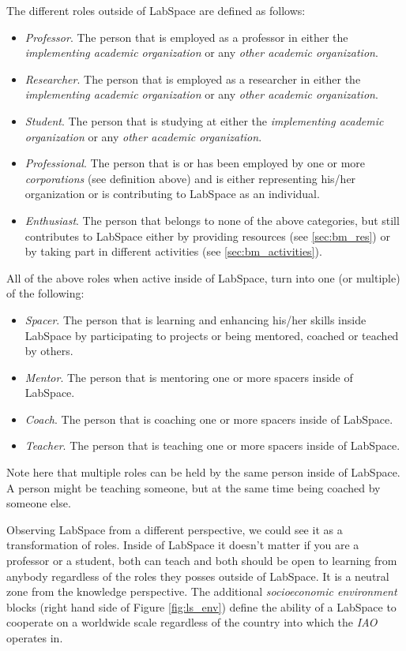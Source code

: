 \documentclass[a4paper, 11pt]{article}
\begin{document}
The different roles outside of LabSpace are defined as follows:

\begin{itemize}[noitemsep]
    \item \textit{Professor}. The person that is employed as a professor in either the \textit{implementing academic organization} or any \textit{other academic organization}.
    \item \textit{Researcher}. The person that is employed as a researcher in either the \textit{implementing academic organization} or any \textit{other academic organization}.
    \item \textit{Student}. The person that is studying at either the \textit{implementing academic organization} or any \textit{other academic organization}.
    \item \textit{Professional}. The person that is or has been employed by one or more \textit{corporations} (see definition above) and is either representing his/her organization or is contributing to LabSpace as an individual.
    \item \textit{Enthusiast}. The person that belongs to none of the above categories, but still contributes to LabSpace either by providing resources (see \ref{sec:bm_res}) or by taking part in different activities  (see \ref{sec:bm_activities}).
\end{itemize}

All of the above roles when active inside of LabSpace, turn into one (or multiple) of the following:

\begin{itemize}[noitemsep]
    \item \textit{Spacer}. The person that is learning and enhancing his/her skills inside LabSpace by participating to projects or being mentored, coached or teached by others.
    \item \textit{Mentor}. The person that is mentoring one or more spacers inside of LabSpace.
    \item \textit{Coach}. The person that is coaching one or more spacers inside of LabSpace.
    \item \textit{Teacher}. The person that is teaching one or more spacers inside of LabSpace.
\end{itemize}

Note here that multiple roles can be held by the same person inside of LabSpace. A person might be teaching someone, but at the same time being coached by someone else.

Observing LabSpace from a different perspective, we could see it as a transformation of roles. Inside of LabSpace it doesn't matter if you are a professor or a student, both can teach and both should be open to learning from anybody regardless of the roles they posses outside of LabSpace. It is a neutral zone from the knowledge perspective. The additional \textit{socioeconomic environment} blocks (right hand side of Figure \ref{fig:ls_env}) define the ability of a LabSpace to cooperate on a worldwide scale regardless of the country into which the \textit{IAO} operates in.
\end{document}
